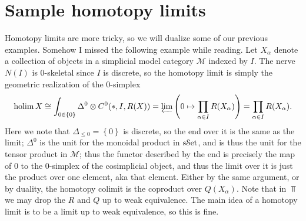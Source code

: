 \section{Sample homotopy limits}

Homotopy limits are more tricky, so we will dualize some of our previous examples. Somehow I missed the following example while reading. Let $X_\alpha$ denote a collection of objects in a simplicial model category $\mathcal{M} $ indexed by $I$. The nerve $N(I)$ is 0-skeletal since $I$ is discrete, so the homotopy limit is simply the geometric realization of the 0-simplex
\[
	\operatorname*{holim} X\cong \int_{0\in \left\{ 0 \right\} } \Delta^0 \otimes  C^0(*,I,R(X))= \varprojlim \left(0\mapsto \prod_{\alpha\in I} R(X_\alpha)\right)=\prod_{\alpha\in I} R(X_\alpha)
.\]
Here we note that $\Delta_{\leq 0} =\left\{ 0 \right\} $ is discrete, so the end over it is the same as the limit; $\Delta^0$ is the unit for the monoidal product in $\mathrm{s}\mathcal{S}\mathrm{et}$, and is thus the unit for the tensor product in $\mathcal{M} $; thus the functor described by the end is precisely the map of 0 to the 0-simplex of the cosimplicial object, and thus the limit over it is just the product over one element, aka that element. Either by the same argument, or by duality, the homotopy colimit is the coproduct over $Q(X_\alpha)$. Note that in $\Top $ we may drop the $R$ and $Q$ up to weak equivalence. The main idea of a homotopy limit is to be a limit up to weak equivalence, so this is fine.

